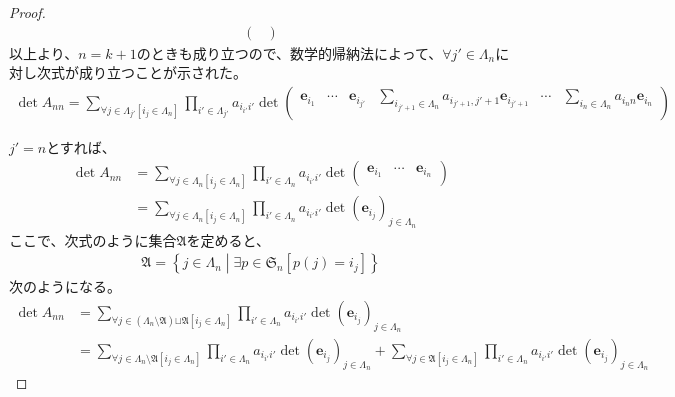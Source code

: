 \documentclass[dvipdfmx]{jsarticle}
\begin{document}
\begin{proof}
\begin{align*}
{\begin{pmatrix}
\end{pmatrix}}
\end{align*}
以上より、$n = k + 1$のときも成り立つので、数学的帰納法によって、$\forall j' \in \varLambda_{n}$に対し次式が成り立つことが示された。
\begin{align*}
\det A_{nn} = \sum_{\forall j \in \varLambda_{j'}\left[ i_{j} \in \varLambda_{n} \right]} {\prod_{i' \in \varLambda_{j'}} a_{i_{i'}i'}\det\begin{pmatrix}
\mathbf{e}_{i_{1}} & \cdots & \mathbf{e}_{i_{j'}} & \sum_{i_{j' + 1} \in \varLambda_{n}} {a_{i_{j' + 1},j' + 1}\mathbf{e}_{i_{j' + 1}}} & \cdots & \sum_{i_{n} \in \varLambda_{n}} {a_{i_{n}n}\mathbf{e}_{i_{n}}} \\
\end{pmatrix}}
\end{align*}\par
$j' = n$とすれば、
\begin{align*}
\det A_{nn} &= \sum_{\forall j \in \varLambda_{n}\left[ i_{j} \in \varLambda_{n} \right]} {\prod_{i' \in \varLambda_{n}} a_{i_{i'}i'}\det\begin{pmatrix}
\mathbf{e}_{i_{1}} & \cdots & \mathbf{e}_{i_{n}} \\
\end{pmatrix}}\\
&= \sum_{\forall j \in \varLambda_{n}\left[ i_{j} \in \varLambda_{n} \right]} {\prod_{i' \in \varLambda_{n}} a_{i_{i'}i'}\det\left( \mathbf{e}_{i_{j}} \right)_{j \in \varLambda_{n}}}
\end{align*}
ここで、次式のように集合$\mathfrak{A}$を定めると、
\begin{align*}
\mathfrak{A} =\left\{ j \in \varLambda_{n} \middle| \exists p \in \mathfrak{S}_{n}\left[ p(j) = i_{j} \right] \right\}
\end{align*}
次のようになる。
\begin{align*}
\det A_{nn} &= \sum_{\forall j \in \left( \varLambda_{n}\mathfrak{\setminus A} \right)\mathfrak{\sqcup A}\left[ i_{j} \in \varLambda_{n} \right]} {\prod_{i' \in \varLambda_{n}} a_{i_{i'}i'}\det\left( \mathbf{e}_{i_{j}} \right)_{j \in \varLambda_{n}}}\\
&= \sum_{\forall j \in \varLambda_{n}\mathfrak{\setminus A}\left[ i_{j} \in \varLambda_{n} \right]} {\prod_{i' \in \varLambda_{n}} a_{i_{i'}i'}\det\left( \mathbf{e}_{i_{j}} \right)_{j \in \varLambda_{n}}} + \sum_{\forall j \in \mathfrak{A}\left[ i_{j} \in \varLambda_{n} \right]} {\prod_{i' \in \varLambda_{n}} a_{i_{i'}i'}\det\left( \mathbf{e}_{i_{j}} \right)_{j \in \varLambda_{n}}}

\end{align*}
\end{proof}
\end{document}
